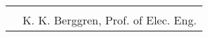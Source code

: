 \documentclass[]{article}
\begin{document}
\vspace{15 mm}
\begin{tabular}{@{}p{1.5in}p{4in}@{}}
  & \hrulefill \\
& K. K. Berggren, Prof. of Elec. Eng.
\end{tabular}

\newpage

\tableofcontents

\newpage







\newpage

% 
\begin{sloppypar}
\printbibliography
\end{sloppypar}
\end{document}
